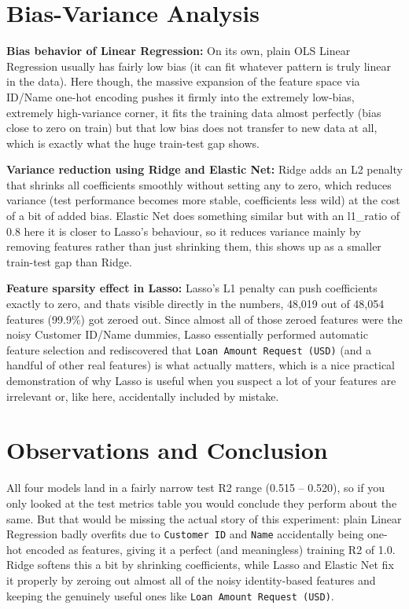 \documentclass[12pt,a4paper]{article}
\begin{document}
\section{Bias-Variance Analysis}

\textbf{Bias behavior of Linear Regression:} On its own, plain OLS Linear Regression usually has fairly low bias (it can fit whatever pattern is truly linear in the data). Here though, the massive expansion of the feature space via ID/Name one-hot encoding pushes it firmly into the extremely low-bias, extremely high-variance corner, it fits the training data almost perfectly (bias close to zero on train) but that low bias does not transfer to new data at all, which is exactly what the huge train-test gap shows.

\textbf{Variance reduction using Ridge and Elastic Net:} Ridge adds an L2 penalty that shrinks all coefficients smoothly without setting any to zero, which reduces variance (test performance becomes more stable, coefficients less wild) at the cost of a bit of added bias. Elastic Net does something similar but with an l1\_ratio of 0.8 here it is closer to Lasso's behaviour, so it reduces variance mainly by removing features rather than just shrinking them, this shows up as a smaller train-test gap than Ridge.

\textbf{Feature sparsity effect in Lasso:} Lasso's L1 penalty can push coefficients exactly to zero, and thats visible directly in the numbers, 48,019 out of 48,054 features (99.9\%) got zeroed out. Since almost all of those zeroed features were the noisy Customer ID/Name dummies, Lasso essentially performed automatic feature selection and rediscovered that \texttt{Loan Amount Request (USD)} (and a handful of other real features) is what actually matters, which is a nice practical demonstration of why Lasso is useful when you suspect a lot of your features are irrelevant or, like here, accidentally included by mistake.

\section{Observations and Conclusion}
All four models land in a fairly narrow test R2 range (0.515 -- 0.520), so if you only looked at the test metrics table you would conclude they perform about the same. But that would be missing the actual story of this experiment: plain Linear Regression badly overfits due to \texttt{Customer ID} and \texttt{Name} accidentally being one-hot encoded as features, giving it a perfect (and meaningless) training R2 of 1.0. Ridge softens this a bit by shrinking coefficients, while Lasso and Elastic Net fix it properly by zeroing out almost all of the noisy identity-based features and keeping the genuinely useful ones like \texttt{Loan Amount Request (USD)}.
\end{document}
